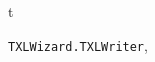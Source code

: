 \documentclass[letterpaper,10pt,english]{sphinxmanual}
\begin{document}
\renewcommand{\indexname}{Python Module Index}
\begin{theindex}
\def\bigletter#1{{\Large\sffamily#1}\nopagebreak\vspace{1mm}}
\bigletter{t}
\item {\texttt{TXLWizard.TXLWriter}}, \pageref{Chapters/40_PythonModuleReference:module-TXLWizard.TXLWriter}
\end{theindex}

\renewcommand{\indexname}{Index}
\printindex
\end{document}
